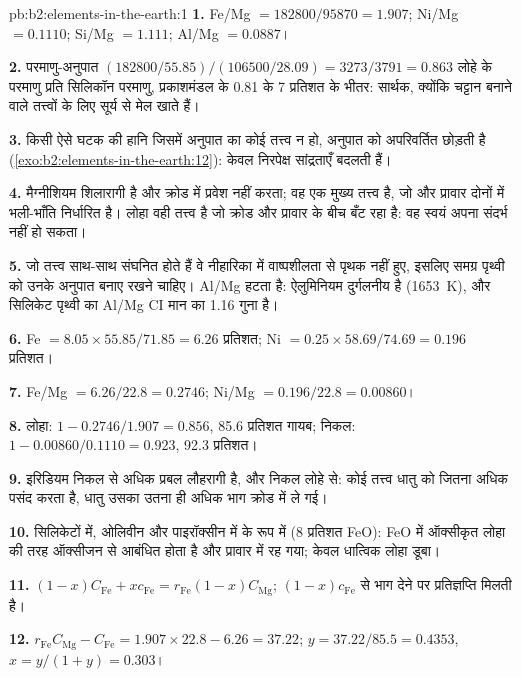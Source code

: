 \begin{solution}{pb:b2:elements-in-the-earth:1}
\textbf{1.} Fe/Mg $= \num{182800}/\num{95870} = 1.907$; Ni/Mg $= 0.1110$; Si/Mg $=
1.111$; Al/Mg $= 0.0887$।

\textbf{2.} परमाणु-अनुपात $(\num{182800}/55.85)/(\num{106500}/28.09) = 3273/3791 = 0.863$ लोहे के परमाणु प्रति
सिलिकॉन परमाणु, प्रकाशमंडल के 0.81 के 7 प्रतिशत के भीतर: सार्थक, क्योंकि चट्टान बनाने वाले तत्त्वों के लिए
 सूर्य से मेल खाते हैं।

\textbf{3.} किसी ऐसे घटक की हानि जिसमें अनुपात का कोई तत्त्व न हो, अनुपात को
अपरिवर्तित छोड़ती है (\cref{exo:b2:elements-in-the-earth:12}): केवल निरपेक्ष सांद्रताएँ बदलती हैं।

\textbf{4.} मैग्नीशियम शिलारागी है और क्रोड में प्रवेश नहीं करता; वह एक मुख्य तत्त्व है,
जो  और प्रावार दोनों में भली-भाँति निर्धारित है। लोहा वही तत्त्व है जो क्रोड और प्रावार
के बीच बँट रहा है: वह स्वयं अपना संदर्भ नहीं हो सकता।

\textbf{5.} जो तत्त्व साथ-साथ संघनित होते हैं वे नीहारिका में वाष्पशीलता से पृथक नहीं हुए,
इसलिए समग्र पृथ्वी को उनके अनुपात बनाए रखने चाहिए। Al/Mg हटता है: ऐलुमिनियम
दुर्गलनीय है (\qty{1653}{K}), और सिलिकेट पृथ्वी का Al/Mg CI मान का 1.16 गुना है।

\textbf{6.} Fe $= 8.05\times55.85/71.85 = 6.26$ प्रतिशत; Ni $= 0.25\times58.69/74.69 =
0.196$ प्रतिशत।

\textbf{7.} Fe/Mg $= 6.26/22.8 = 0.2746$; Ni/Mg $= 0.196/22.8 = 0.00860$।

\textbf{8.} लोहा: $1 - 0.2746/1.907 = 0.856$, 85.6 प्रतिशत गायब; निकल:
$1 - 0.00860/0.1110 = 0.923$, 92.3 प्रतिशत।

\textbf{9.} इरिडियम निकल से अधिक प्रबल लौहरागी है, और निकल लोहे से:
कोई तत्त्व धातु को जितना अधिक पसंद करता है, धातु उसका उतना ही अधिक भाग क्रोड में ले गई।

\textbf{10.} सिलिकेटों में, ओलिवीन और पाइरॉक्सीन में  के रूप में (8 प्रतिशत FeO):
FeO में ऑक्सीकृत लोहा  की तरह ऑक्सीजन से आबंधित होता है और
प्रावार में रह गया; केवल धात्विक लोहा डूबा।

\textbf{11.} $(1-x)C_{\mathrm{Fe}} + xc_{\mathrm{Fe}} = r_{\mathrm{Fe}}(1-x)C_{\mathrm{Mg}}$;
$(1-x)c_{\mathrm{Fe}}$ से भाग देने पर प्रतिज्ञप्ति मिलती है।

\textbf{12.} $r_{\mathrm{Fe}}C_{\mathrm{Mg}} - C_{\mathrm{Fe}} = 1.907\times22.8 - 6.26 =
37.22$; $y = 37.22/85.5 = 0.4353$, $x = y/(1+y) = 0.303$।


\end{solution}
